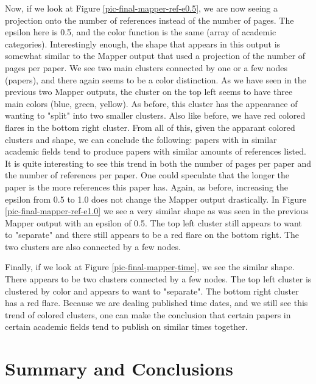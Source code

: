 \documentclass[12pt]{article}
\theoremstyle{definition}
\begin{document}
\newline
\par Now, if we look at Figure \ref{pic-final-mapper-ref-e0.5}, we are now seeing a projection onto the number of references instead of the number of pages. The epsilon here is 0.5, and the color function is the same (array of academic categories). Interestingly enough, the shape that appears in this output is somewhat similar to the Mapper output that used a projection of the number of pages per paper. We see two main clusters connected by one or a few nodes (papers), and there again seems to be a color distinction. As we have seen in the previous two Mapper outputs, the cluster on the top left seems to have three main colors (blue, green, yellow). As before, this cluster has the appearance of wanting to "split" into two smaller clusters. Also like before, we have red colored flares in the bottom right cluster. From all of this, given the apparant colored clusters and shape, we can conclude the following: papers with in similar academic fields tend to produce papers with similar amounts of references listed. It is quite interesting to see this trend in both the number of pages per paper and the number of references per paper. One could speculate that the longer the paper is the more references this paper has. Again, as before, increasing the epsilon from 0.5 to 1.0 does not change the Mapper output drastically. In Figure \ref{pic-final-mapper-ref-e1.0} we see a very similar shape as was seen in the previous Mapper output with an epsilon of 0.5. The top left cluster still appears to want to "separate" and there still appears to be a red flare on the bottom right. The two clusters are also connected by a few nodes. 
\newline
\par Finally, if we look at Figure \ref{pic-final-mapper-time}, we see the similar shape. There appears to be two clusters connected by a few nodes. The top left cluster is clustered by color and appears to want to "separate". The bottom right cluster has a red flare. Because we are dealing published time dates, and we still see this trend of colored clusters, one can make the conclusion that certain papers in certain academic fields tend to publish on similar times together.  

\section{Summary and Conclusions}
\end{document}
